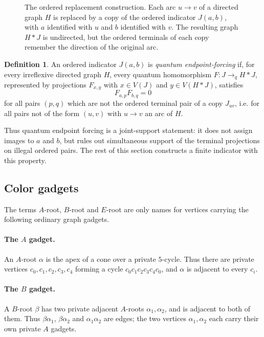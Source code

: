 \documentclass[11pt]{amsart}
\theoremstyle{plain}
\theoremstyle{definition}
\newtheorem{definition}[theorem]{Definition}
\newcommand{\toq}{\to_q}
\begin{document}
\begin{figure}[htbp]
\centering

\caption{The ordered replacement construction.  Each arc $u\to v$ of a directed graph $H$ is replaced by a copy of the ordered indicator $J(a,b)$, with $a$ identified with $u$ and $b$ identified with $v$.  The resulting graph $H*J$ is undirected, but the ordered terminals of each copy remember the direction of the original arc.}
\label{fig:replacement-construction}
\end{figure}

\begin{definition}\label{def:endpoint-forcing}
An ordered indicator $J(a,b)$ is \emph{quantum endpoint-forcing} if, for every irreflexive directed graph $H$, every quantum homomorphism $F:J\toq H*J$, represented by projections $F_{x,y}$ with $x\in V(J)$ and $y\in V(H*J)$, satisfies
\[
   F_{a,p}F_{b,q}=0
\]
for all pairs $(p,q)$ which are not the ordered terminal pair of a copy $J_{uv}$, i.e. for all pairs not of the form $(u,v)$ with $u\to v$ an arc of $H$.
\end{definition}

Thus quantum endpoint forcing is a joint-support statement: it does not assign images to $a$ and $b$, but rules out simultaneous support of the terminal projections on illegal ordered pairs.  The rest of this section constructs a finite indicator with this property.

\subsection{Color gadgets}

The terms $A$-root, $B$-root and $E$-root are only names for vertices carrying the following ordinary graph gadgets.

\paragraph{The $A$ gadget.}
An $A$-root $\alpha$ is the apex of a cone over a private $5$-cycle.  Thus there are private vertices $c_0,c_1,c_2,c_3,c_4$ forming a cycle $c_0c_1c_2c_3c_4c_0$, and $\alpha$ is adjacent to every $c_i$.

\paragraph{The $B$ gadget.}
A $B$-root $\beta$ has two private adjacent $A$-roots $\alpha_1,\alpha_2$, and is adjacent to both of them.  Thus $\beta\alpha_1$, $\beta\alpha_2$ and $\alpha_1\alpha_2$ are edges; the two vertices $\alpha_1,\alpha_2$ each carry their own private $A$ gadgets.
\end{document}
